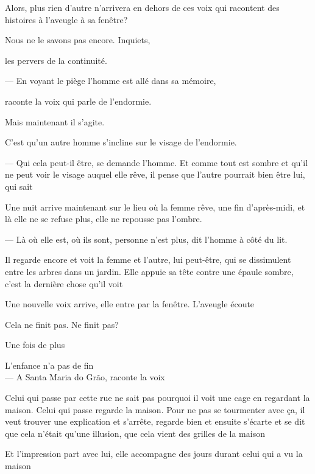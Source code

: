 Alors, plus rien d'autre n'arrivera en dehors de ces voix qui racontent
des histoires à l'aveugle à sa fenêtre?

Nous ne le savons pas encore. Inquiets,

les pervers de la continuité.

\pagebreak

\vspace*{4cm}

--- En voyant le piège l'homme est allé dans sa mémoire,

raconte la voix qui parle de l'endormie.

Mais maintenant il s'agite.

C'est qu'un autre homme s'incline sur le visage de l'endormie.

--- Qui cela peut-il être, se demande l'homme. Et comme tout est sombre et
qu'il ne peut voir le visage auquel elle rêve, il pense que l'autre
pourrait bien être lui, qui sait

Une nuit arrive maintenant sur le lieu où la femme rêve, une fin
d'après-midi, et là elle ne se refuse plus, elle ne repousse pas
l'ombre.

--- Là où elle est, où ils sont, personne n'est plus, dit l'homme à côté
du lit.

Il regarde encore et voit la femme et l'autre, lui peut-être, qui se
dissimulent entre les arbres dans un jardin. Elle appuie sa tête contre
une épaule sombre, c'est la dernière chose qu'il voit

\pagebreak

\vspace*{4cm}

Une nouvelle voix arrive, elle entre par la fenêtre. L'aveugle écoute

Cela ne finit pas. Ne finit pas?

Une fois de plus

L'enfance n'a pas de fin\\

--- A Santa Maria do Grão, raconte la voix

Celui qui passe par cette rue ne sait pas pourquoi il voit une cage en
regardant la maison. Celui qui passe regarde la maison. Pour ne pas se
tourmenter avec ça, il veut trouver une explication et s'arrête, regarde
bien et ensuite s'écarte et se dit que cela n'était qu'une illusion, que
cela vient des grilles de la maison

Et l'impression part avec lui, elle accompagne des jours durant celui
qui a vu la maison

